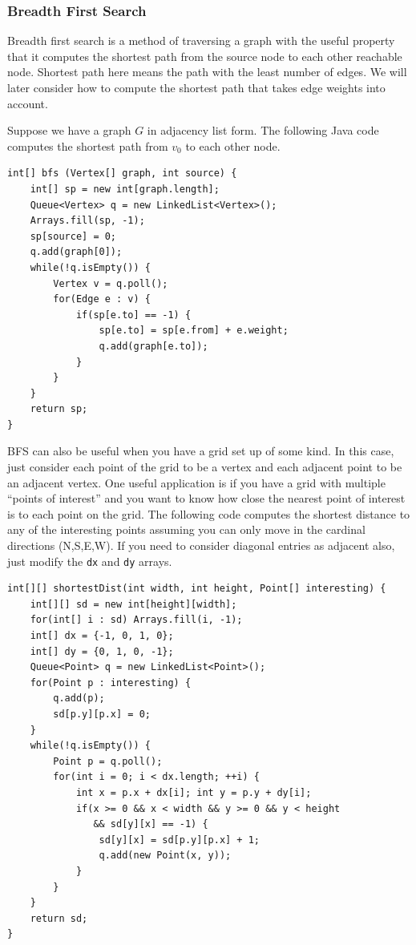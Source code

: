 \documentclass[a4paper,12pt]{article}
\begin{document}
\subsubsection{Breadth First Search}

Breadth first search is a method of traversing a graph with the useful property that it computes the shortest path from the source node to each other reachable node. Shortest path here means the path with the least number of edges. We will later consider how to compute the shortest path that takes edge weights into account.

Suppose we have a graph $G$ in adjacency list form. The following Java code computes the shortest path from $v_0$ to each other node. 

\begin{lstlisting}
int[] bfs (Vertex[] graph, int source) {
	int[] sp = new int[graph.length];
	Queue<Vertex> q = new LinkedList<Vertex>();
	Arrays.fill(sp, -1);
	sp[source] = 0;
	q.add(graph[0]);
	while(!q.isEmpty()) {
		Vertex v = q.poll();
		for(Edge e : v) {
			if(sp[e.to] == -1) {
				sp[e.to] = sp[e.from] + e.weight;
				q.add(graph[e.to]);
			}
		}
	}
	return sp;
}
\end{lstlisting}

BFS can also be useful when you have a grid set up of some kind. In this case, just consider each point of the grid to be a vertex and each adjacent point to be an adjacent vertex. One useful application is if you have a grid with multiple ``points of interest'' and you want to know how close the nearest point of interest is to each point on the grid. The following code computes the shortest distance to any of the interesting points assuming you can only move in the cardinal directions (N,S,E,W). If you need to consider diagonal entries as adjacent also, just modify the \lstinline/dx/ and \lstinline/dy/ arrays.

\begin{lstlisting}
int[][] shortestDist(int width, int height, Point[] interesting) {
	int[][] sd = new int[height][width];
	for(int[] i : sd) Arrays.fill(i, -1);
	int[] dx = {-1, 0, 1, 0};
	int[] dy = {0, 1, 0, -1};
	Queue<Point> q = new LinkedList<Point>();
	for(Point p : interesting) {
		q.add(p);
		sd[p.y][p.x] = 0;
	}
	while(!q.isEmpty()) {
		Point p = q.poll();
		for(int i = 0; i < dx.length; ++i) {
			int x = p.x + dx[i]; int y = p.y + dy[i];
			if(x >= 0 && x < width && y >= 0 && y < height 
			   && sd[y][x] == -1) {
				sd[y][x] = sd[p.y][p.x] + 1;
				q.add(new Point(x, y));
			}
		}
	}
	return sd;
}
\end{lstlisting} 
\end{document}

